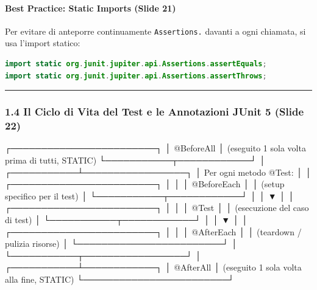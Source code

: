 \documentclass[11pt,a4paper]{article}
\newcommand{\passthrough}[1]{#1}
\begin{document}
\paragraph{Best Practice: Static Imports (Slide
21)}\label{best-practice-static-imports-slide-21}

Per evitare di anteporre continuamente
\passthrough{\lstinline!Assertions.!} davanti a ogni chiamata, si usa
l'import statico:

\begin{lstlisting}[language=Java]
import static org.junit.jupiter.api.Assertions.assertEquals;
import static org.junit.jupiter.api.Assertions.assertThrows;
\end{lstlisting}

\begin{center}\rule{0.5\linewidth}{0.5pt}\end{center}

\subsubsection{1.4 Il Ciclo di Vita del Test e le Annotazioni JUnit 5
(Slide
22)}\label{il-ciclo-di-vita-del-test-e-le-annotazioni-junit-5-slide-22}

\needspace{7cm}
\begin{asciibox}
┌────────────────────────┐
│      @BeforeAll        │ (eseguito 1 sola volta prima di tutti, STATIC)
└───────────┬────────────┘
            │
┌───────────┴─────────────────┐
│   Per ogni metodo @Test:    │
│  ┌────────────────────────┐ │
│  │      @BeforeEach       │ │ (setup specifico per il test)
│  └───────────┬────────────┘ │
│              ▼              │
│  ┌────────────────────────┐ │
│  │         @Test          │ │ (esecuzione del caso di test)
│  └───────────┬────────────┘ │
│              ▼              │
│  ┌────────────────────────┐ │
│  │       @AfterEach       │ │ (teardown / pulizia risorse)
│  └────────────────────────┘ │
└───────────┬─────────────────┘
            │
┌───────────┴────────────┐
│       @AfterAll        │ (eseguito 1 sola volta alla fine, STATIC)
└────────────────────────┘
\end{asciibox}
\end{document}
